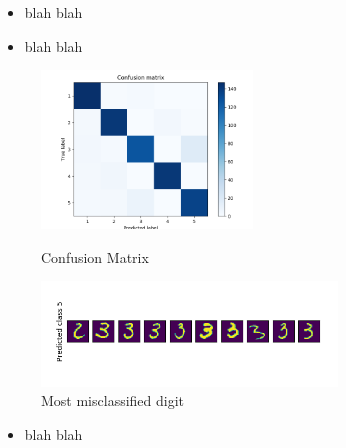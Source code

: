 \documentclass[a4paper]{article}
\begin{document}
\begin{itemize}
  \item blah blah
  \item blah blah
\end{itemize}
\begin{figure}[h]
  \begin{center}
    \includegraphics[width=0.5\textwidth]{3_b_cm.png}
    \caption{Confusion Matrix}
    \includegraphics[width=0.7\textwidth]{3_b_err.png}
    \caption{Most misclassified digit}
  \end{center}
\end{figure}
\begin{itemize}
  \item blah blah
\end{itemize}
\end{document}

